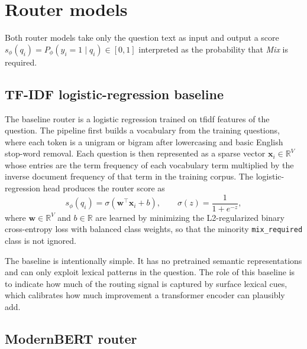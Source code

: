 \documentclass[english, bibtex]{kththesis}               %
\numberwithin{listing}{chapter}
\begin{document}
\section{Router models}
\label{sec:methodRouters}

Both router models take only the question text as input and output a score \(s_\phi(q_i) = P_\phi(y_i = 1 \mid q_i) \in [0,1]\) interpreted as the probability that \emph{Mix} is required.

\subsection{TF-IDF logistic-regression baseline}
\label{sec:methodTfidf}

The baseline router is a logistic regression trained on \gls{tfidf} features of the question. The pipeline first builds a vocabulary from the training questions, where each token is a unigram or bigram after lowercasing and basic English stop-word removal. Each question is then represented as a sparse vector \(\mathbf{x}_i \in \mathbb{R}^{V}\) whose entries are the term frequency of each vocabulary term multiplied by the inverse document frequency of that term in the training corpus. The logistic-regression head produces the router score as
\begin{equation}
\label{eq:tfidfScore}
s_\phi(q_i) = \sigma(\mathbf{w}^\top \mathbf{x}_i + b),
\qquad
\sigma(z) = \frac{1}{1 + e^{-z}},
\end{equation}
where \(\mathbf{w} \in \mathbb{R}^{V}\) and \(b \in \mathbb{R}\) are learned by minimizing the L2-regularized binary cross-entropy loss with balanced class weights, so that the minority \texttt{mix\_required} class is not ignored.

The baseline is intentionally simple. It has no pretrained semantic representations and can only exploit lexical patterns in the question. The role of this baseline is to indicate how much of the routing signal is captured by surface lexical cues, which calibrates how much improvement a transformer encoder can plausibly add.

\subsection{ModernBERT router}
\label{sec:methodModernBert}
\end{document}
